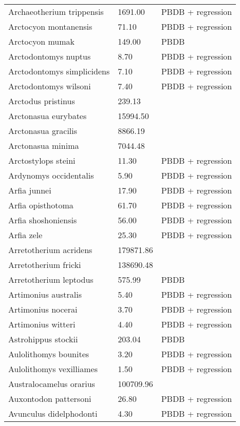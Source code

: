 \documentclass{article}
\begin{document}
\begin{center}
\begin{longtable}{p{} p{} p{}}
    Archaeotherium trippensis & 1691.00 & PBDB + regression \\ 
    Arctocyon montanensis & 71.10 & PBDB + regression \\ 
    Arctocyon mumak & 149.00 & PBDB \\ 
    Arctodontomys nuptus & 8.70 & PBDB + regression \\ 
    Arctodontomys simplicidens & 7.10 & PBDB + regression \\ 
    Arctodontomys wilsoni & 7.40 & PBDB + regression \\ 
    Arctodus pristinus & 239.13 & \cite{Smith2004} \\ 
    Arctonasua eurybates & 15994.50 & \cite{Tomiya2013} \\ 
    Arctonasua gracilis & 8866.19 & \cite{Tomiya2013} \\ 
    Arctonasua minima & 7044.48 & \cite{Tomiya2013} \\ 
    Arctostylops steini & 11.30 & PBDB + regression \\ 
    Ardynomys occidentalis & 5.90 & PBDB + regression \\ 
    Arfia junnei & 17.90 & PBDB + regression \\ 
    Arfia opisthotoma & 61.70 & PBDB + regression \\ 
    Arfia shoshoniensis & 56.00 & PBDB + regression \\ 
    Arfia zele & 25.30 & PBDB + regression \\ 
    Arretotherium acridens & 179871.86 & \cite{Tomiya2013} \\ 
    Arretotherium fricki & 138690.48 & \cite{Tomiya2013} \\ 
    Arretotherium leptodus & 575.99 & PBDB \\ 
    Artimonius australis & 5.40 & PBDB + regression \\ 
    Artimonius nocerai & 3.70 & PBDB + regression \\ 
    Artimonius witteri & 4.40 & PBDB + regression \\ 
    Astrohippus stockii & 203.04 & PBDB \\ 
    Aulolithomys bounites & 3.20 & PBDB + regression \\ 
    Aulolithomys vexilliames & 1.50 & PBDB + regression \\ 
    Australocamelus orarius & 100709.96 & \cite{Tomiya2013} \\ 
    Auxontodon pattersoni & 26.80 & PBDB + regression \\ 
    Avunculus didelphodonti & 4.30 & PBDB + regression \\ 

\end{longtable}
\end{center}
\end{document}
